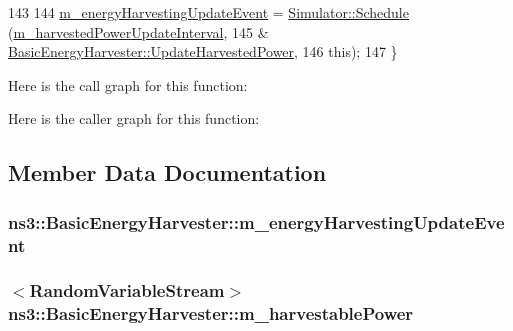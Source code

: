 \begin{DoxyCode}
143 
144   \hyperlink{classns3_1_1BasicEnergyHarvester_abb6206e5618287f67c20100848e617f8}{m\_energyHarvestingUpdateEvent} = 
      \hyperlink{classns3_1_1Simulator_a671882c894a08af4a5e91181bf1eec13}{Simulator::Schedule} (\hyperlink{classns3_1_1BasicEnergyHarvester_af7c4045894b090b4f89d10ba9aa2553b}{m\_harvestedPowerUpdateInterval},
145                                                        &
      \hyperlink{classns3_1_1BasicEnergyHarvester_aa1a0d934e9024f469a6b06b3b960f34e}{BasicEnergyHarvester::UpdateHarvestedPower},
146                                                        \textcolor{keyword}{this});
147 \}
\end{DoxyCode}


Here is the call graph for this function\+:




Here is the caller graph for this function\+:




\subsection{Member Data Documentation}
\subsubsection[{\texorpdfstring{m\+\_\+energy\+Harvesting\+Update\+Event}{m_energyHarvestingUpdateEvent}}]{ ns3\+::\+Basic\+Energy\+Harvester\+::m\+\_\+energy\+Harvesting\+Update\+Event\hspace{0.3cm}{\ttfamily [private]}}\hypertarget{classns3_1_1BasicEnergyHarvester_abb6206e5618287f67c20100848e617f8}{}\label{classns3_1_1BasicEnergyHarvester_abb6206e5618287f67c20100848e617f8}
\subsubsection[{\texorpdfstring{m\+\_\+harvestable\+Power}{m_harvestablePower}}]{$<${\bf Random\+Variable\+Stream}$>$ ns3\+::\+Basic\+Energy\+Harvester\+::m\+\_\+harvestable\+Power\hspace{0.3cm}{\ttfamily [private]}}\hypertarget{classns3_1_1BasicEnergyHarvester_a0db55946a8ce3ff8a854754e26bc26ba}{}\label{classns3_1_1BasicEnergyHarvester_a0db55946a8ce3ff8a854754e26bc26ba}

